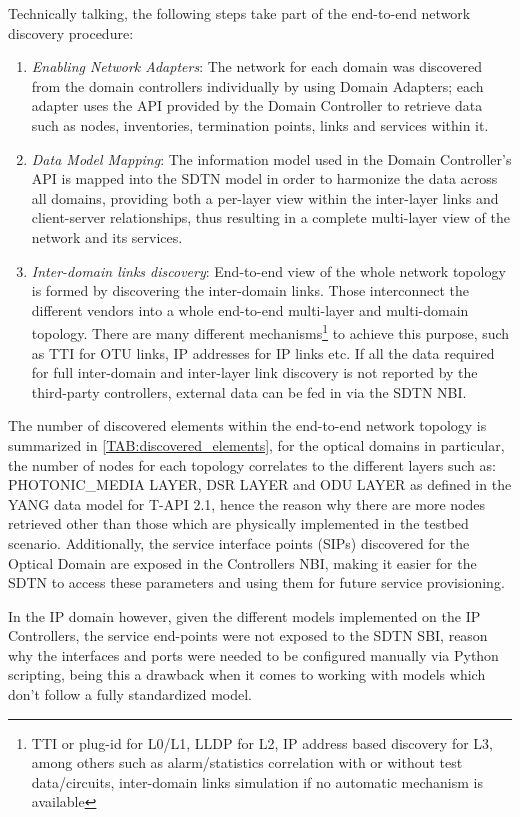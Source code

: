 \documentclass[a4paper,fleqn]{cas-dc}
\begin{document}
Technically talking, the following steps take part of the end-to-end network discovery procedure:
\begin{enumerate}
    \item \textit{Enabling Network Adapters}: The network for each domain was discovered from the domain controllers individually by using Domain Adapters; each adapter uses the API provided by the Domain Controller to retrieve data such as nodes, inventories, termination points, links and services within it.
    \item \textit{Data Model Mapping}: The information model used in the Domain Controller's API is mapped into the SDTN model in order to harmonize the data across all domains, providing both a per-layer view within the inter-layer links and client-server relationships, thus resulting in a complete multi-layer view of the network and its services.
    \item \textit{Inter-domain links discovery}: End-to-end view of the whole network topology is formed by discovering the inter-domain links. Those interconnect the different vendors into a whole end-to-end multi-layer and multi-domain topology. There are many different mechanisms\footnote{TTI or plug-id for L0/L1, LLDP for L2, IP address based discovery for L3, among others such as alarm/statistics correlation with or without test data/circuits, inter-domain links simulation if no automatic mechanism is available} 
    to achieve this purpose, such as TTI for OTU links, IP addresses for IP links etc. If all the data required for full inter-domain and inter-layer link discovery is not reported by the third-party controllers, external data can be fed in via the SDTN NBI. 
\end{enumerate}

The number of discovered elements within the end-to-end network topology is summarized in \cref{TAB:discovered_elements}, for the optical domains in particular, the number of nodes for each topology correlates to the different layers such as:
PHOTONIC\_MEDIA LAYER, DSR LAYER and ODU LAYER as defined in the YANG data model for T-API 2.1, hence the reason why there are more nodes retrieved other than those which are physically implemented in the testbed scenario. Additionally, the service interface points (SIPs) discovered for the Optical Domain are exposed in the Controllers NBI, making it easier for the SDTN to access these parameters and using them for future service provisioning. 

In the IP domain however, given the different models implemented on the IP Controllers, the service end-points were not exposed to the SDTN SBI, reason why the interfaces and ports were needed to be configured manually via Python scripting, being this a drawback when it comes to working with models which don’t follow a fully standardized model.
\end{document}
